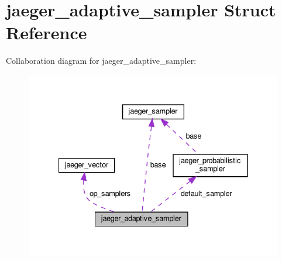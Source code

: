 \hypertarget{structjaeger__adaptive__sampler}{}\section{jaeger\+\_\+adaptive\+\_\+sampler Struct Reference}
\label{structjaeger__adaptive__sampler}


Collaboration diagram for jaeger\+\_\+adaptive\+\_\+sampler\+:\nopagebreak
\begin{figure}[H]
\begin{center}
\leavevmode
\includegraphics[width=335pt]{structjaeger__adaptive__sampler__coll__graph}
\end{center}
\end{figure}
